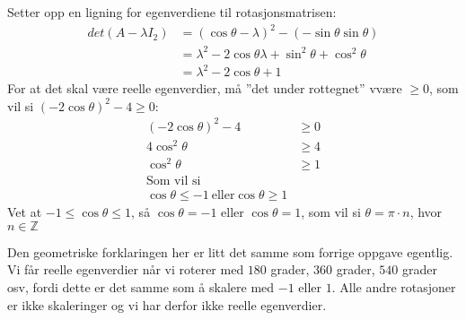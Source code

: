 \documentclass[11pt, a4paper, norsk]{NTNUoving}
\begin{document}
\begin{oppgave}
\begin{punkt}
            Setter opp en ligning for egenverdiene til rotasjonsmatrisen:
            \begin{align*}
                det(A - \lambda I_{2}) &= (\cos{\theta}-\lambda)^2 - (-\sin{\theta}\sin{\theta}) \\
                                       &= \lambda^2 -2\cos{\theta}\lambda + \sin^{2}{\theta} + \cos^{2}{\theta} \\
                                       &= \lambda^2 -2\cos{\theta} + 1
            \end{align*}
            For at det skal være reelle egenverdier, må ''det under rottegnet'' vvære $\geq 0$, som vil si $(-2\cos{\theta})^2 -4 \geq 0$:
            \begin{align*}
                (-2\cos{\theta})^2 - 4 &\geq 0 \\
                4\cos^{2}{\theta} &\geq 4 \\
                \cos^{2}{\theta} &\geq 1 \\
                \text{Som vil si}
                \\
                \cos{\theta} \leq -1 \: \text{eller} \cos{\theta} \geq 1
            \end{align*}
            Vet at $-1 \leq \cos{\theta} \leq 1$, så $\cos{\theta} = -1$ eller $\cos{\theta} = 1$, som vil si $\theta = \pi \cdot n$, hvor $n \in \mathbb{Z}$

            Den geometriske forklaringen her er litt det samme som forrige oppgave egentlig. Vi får reelle egenverdier når vi roterer med $180$ grader, $360$ grader, $540$ grader osv, fordi dette er det samme som å skalere med $-1$ eller $1$. Alle andre rotasjoner er ikke skaleringer og vi har derfor ikke reelle egenverdier. 
        \end{punkt}
    \end{oppgave}
\end{document}
